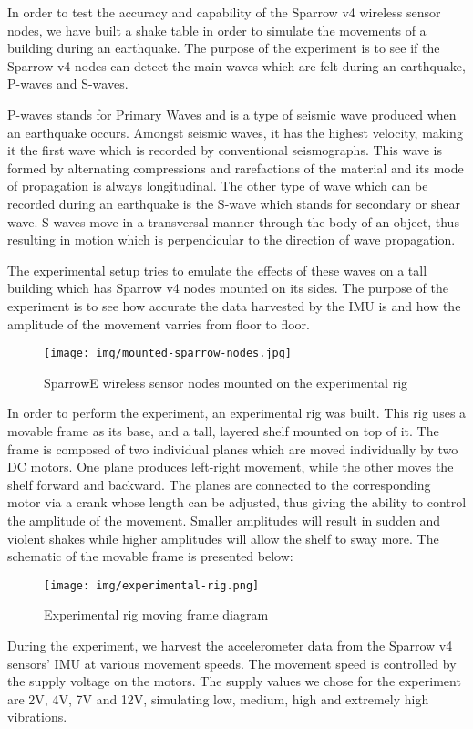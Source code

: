 In order to test the accuracy and capability of the Sparrow v4 wireless sensor nodes, we 
have built a shake table in order to simulate the movements of a building during an earthquake.
The purpose of the experiment is to see if the Sparrow v4 nodes can detect the main waves which 
are felt during an earthquake, P-waves and S-waves.

P-waves stands for Primary Waves and is a type of seismic wave produced when an earthquake occurs.
Amongst seismic waves, it has the highest velocity, making it the first wave which is recorded by 
conventional seismographs. This wave is formed by alternating compressions and rarefactions of the 
material and its mode of propagation is always longitudinal. The other type of wave which can be 
recorded during an earthquake is the S-wave which stands for secondary or shear wave. S-waves move 
in a transversal manner through the body of an object, thus resulting in motion which is perpendicular 
to the direction of wave propagation. 

The experimental setup tries to emulate the effects of these waves on a tall building which has Sparrow v4 
nodes mounted on its sides. The purpose of the experiment is to see how accurate the data harvested by the 
IMU is and how the amplitude of the movement varries from floor to floor.

\begin{figure}[ht] \centering
  \texttt{[image: img/mounted-sparrow-nodes.jpg]}
  \caption{SparrowE wireless sensor nodes mounted on the experimental rig}
\end{figure}

In order to perform the experiment, an experimental rig was built. This rig uses a movable frame as its base, 
and a tall, layered shelf mounted on top of it. The frame is composed of two individual planes which are moved 
individually by two DC motors. One plane produces left-right movement, while the other moves the shelf forward and 
backward. The planes are connected to the corresponding motor via a crank whose length can be adjusted, thus giving the 
ability to control the amplitude of the movement. Smaller amplitudes will result in sudden and violent shakes while 
higher amplitudes will allow the shelf to sway more. The schematic of the movable frame is presented below:

\begin{figure}[ht] \centering
  \texttt{[image: img/experimental-rig.png]}
  \caption{Experimental rig moving frame diagram}
\end{figure}

During the experiment, we harvest the accelerometer data from the Sparrow v4 sensors' IMU at various movement speeds.
The movement speed is controlled by the supply voltage on the motors. The supply values we chose for the experiment 
are 2V, 4V, 7V and 12V, simulating low, medium, high and extremely high vibrations.
